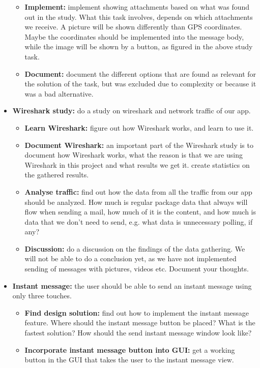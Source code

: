 \begin{itemize}
\begin{itemize}
\item{}\textbf{Implement:} implement showing attachments based on what was found out in the study. What this task involves, depends on which attachments we receive. A picture will be shown differently than GPS coordinates. Maybe the coordinates should be implemented into the message body, while the image will be shown by a button, as figured in the above study task.
\item{}\textbf{Document:} document the different options that are found as relevant for the solution of the task, but was excluded due to complexity or because it was a bad alternative.
\end{itemize}
\item{}\textbf{Wireshark study:} do a study on wireshark and network traffic of our app.
\begin{itemize}
\item{}\textbf{Learn Wireshark:} figure out how Wireshark works, and learn to use it.
\item{}\textbf{Document Wireshark:} an important part of the Wireshark study is to document how Wireshark works, what the reason is that we are using Wireshark in this project and what results we get it. create statistics on the gathered results.
\item{}\textbf{Analyse traffic:} find out how the data from all the traffic from our app should be analyzed. How much is regular package data that always will flow when sending a mail, how much of it is the content, and how much is data that we don’t need to send, e.g. what data is unnecessary polling, if any?
\item{}\textbf{Discussion:} do a discussion on the findings of the data gathering. We will not be able to do a conclusion yet, as we have not implemented sending of messages with pictures, videos etc. Document your thoughts.
\end{itemize}
\item{}\textbf{Instant message:} the user should be able to send an instant message using only three touches.
\begin{itemize}
\item{}\textbf{Find design solution:} find out how to implement the instant message feature. Where should the instant message button be placed? What is the fastest solution? How should the send instant message window look like?
\item{}\textbf{Incorporate instant message button into GUI:} get a working button in the GUI that takes the user to the instant message view.

\end{itemize}
\end{itemize}
